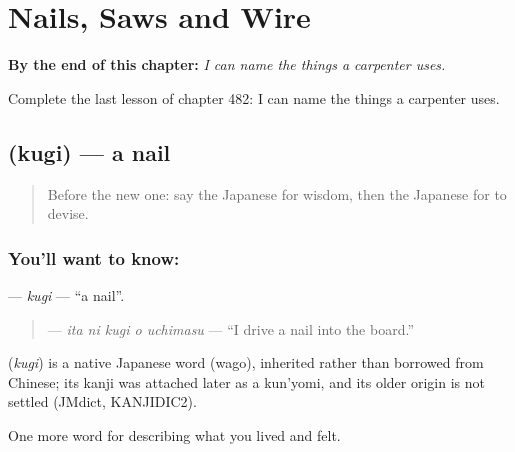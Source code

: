 
\chapter{Nails, Saws and Wire}
\label{ch:ja-nails-saws-and-wire}

\begin{chapteropening}
\textbf{By the end of this chapter:} \emph{I can name the things a carpenter uses.}

Complete the last lesson of chapter 482: I can name the things a carpenter uses.
\end{chapteropening}

\section[\texorpdfstring{\ja{くぎ} (kugi)}{くぎ (kugi)}]{ (kugi) — a nail}

\label{lesson:JA-C482-kugi}



\begin{quote}
Before the new one: say the Japanese for wisdom, then the Japanese for to devise.
\end{quote}

\subsection*{You'll want to know: }
\textbf{} — \emph{kugi} — \textquotedblleft{}a nail\textquotedblright{}.

\begin{quote}
\textbf{  } — \emph{ita ni kugi o uchimasu} — \textquotedblleft{}I drive a nail into the board.\textquotedblright{}
\end{quote}

\begin{cousinweb}
\textbf{} (\emph{kugi}) is a native Japanese word (wago), inherited rather than borrowed from Chinese; its kanji was attached later as a kun'yomi, and its older origin is not settled (JMdict, KANJIDIC2).
\end{cousinweb}

\begin{grammarlens}[title={What you've built}]
One more word for describing what you lived and felt.
\end{grammarlens}

